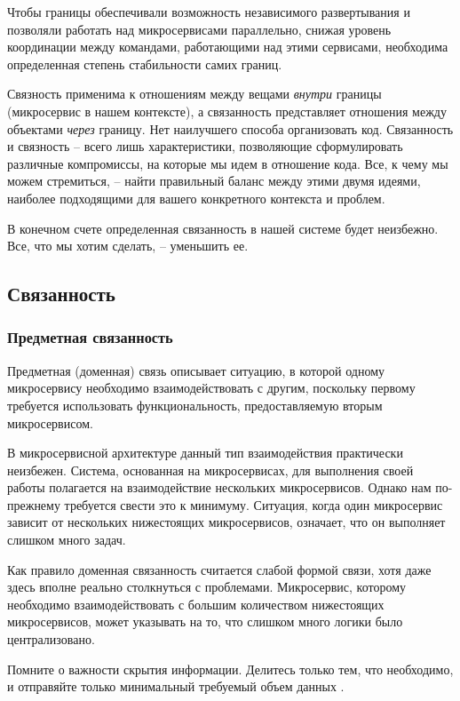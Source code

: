 \documentclass[%
	11pt,
	a4paper,
	utf8,
		]{article}
\begin{document}
Чтобы границы обеспечивали возможность независимого развертывания и позволяли работать над микросервисами параллельно, снижая уровень координации между командами, работающими над этими сервисами, необходима определенная степень стабильности самих границ.

Связность применима к отношениям между вещами \emph{внутри} границы (микросервис в нашем контексте), а связанность представляет отношения между объектами \emph{через} границу. Нет наилучшего способа организовать код. Связанность и связность -- всего лишь характеристики, позволяющие сформулировать различные компромиссы, на которые мы идем в отношение кода. Все, к чему мы можем стремиться, -- найти правильный баланс между этими двумя идеями, наиболее подходящими для вашего конкретного контекста и проблем.

В конечном счете определенная связанность в нашей системе будет неизбежно. Все, что мы хотим сделать, -- уменьшить ее.

\subsection{Связанность}

\subsubsection{Предметная связанность}

Предметная (доменная) связь описывает ситуацию, в которой одному микросервису необходимо взаимодействовать с другим, поскольку первому требуется использовать функциональность, предоставляемую вторым микросервисом.

В микросервисной архитектуре данный тип взаимодействия практически неизбежен. Система, основанная на микросервисах, для выполнения своей работы полагается на взаимодействие нескольких микросервисов. Однако нам по-прежнему требуется свести это к минимуму. Ситуация, когда один микросервис зависит от нескольких нижестоящих микросервисов, означает, что он выполняет слишком много задач.

Как правило доменная связанность считается слабой формой связи, хотя даже здесь вполне реально столкнуться с проблемами. Микросервис, которому необходимо взаимодействовать с большим количеством нижестоящих микросервисов, может указывать на то, что слишком много логики было централизовано.

Помните о важности скрытия информации. Делитесь только тем, что необходимо, и отправяйте только минимальный требуемый объем данных \cite[]{microservices-2024}.
\end{document}

